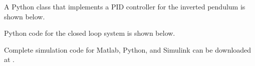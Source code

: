 A Python class that implements a PID controller for the inverted pendulum is shown below.


Python code for the closed loop system is shown below.


Complete simulation code for Matlab, Python, and Simulink can be downloaded at .



